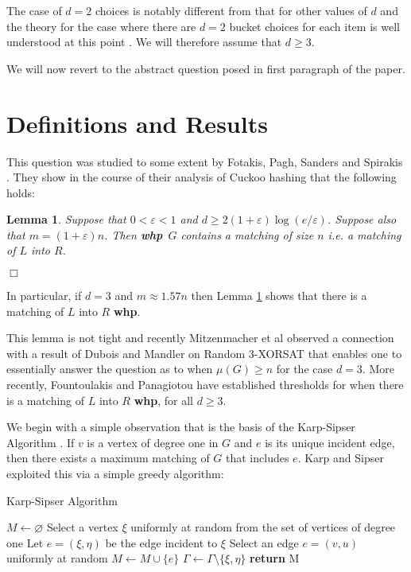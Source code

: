 \documentclass[11pt]{article}
\def\e{\varepsilon}
\def\G{\Gamma}
\def\m{\mu}
\def\whp{{\bf whp}}
\newcommand{\proofend}{\hspace*{\fill}\mbox{$\Box$}}
\newtheorem{lemma}[theorem]{Lemma}
\begin{document}
The case of $d=2$ choices is notably different from that for other values
of $d$ and the theory for the case where there are $d = 2$ 
bucket choices for each item is well understood at this point
\cite{DM,kutz,cuckoo}. We will therefore assume that $d\geq 3$.

We will now revert to the abstract question posed in first paragraph of the paper.
\section{Definitions and Results}
This question was studied to some extent by Fotakis, Pagh, Sanders and Spirakis \cite{fotakis}.
They show in the course of their analysis of Cuckoo hashing that the following holds:
\begin{lemma}\label{fot}
Suppose that $0<\e<1$ and $d\geq 2(1+\e)\log(e/\e)$. Suppose also that $m=(1+\e)n$. Then
\whp\ $G$ contains a matching of size $n$ i.e. a matching of $L$ into $R$.
\end{lemma}
\proofend

In particular, if $d=3$ and $m\approx 1.57n$ then Lemma \ref{fot} shows that there is a matching of $L$ into $R$ \whp.

This lemma is not tight and recently  Mitzenmacher et al \cite{DMP} observed a connection with a result of
Dubois and Mandler on Random 3-XORSAT \cite{DuMa} that enables one to essentially answer the question as to when
$\m(G)\geq n$ for the case $d=3$. More recently, Fountoulakis and Panagiotou \cite{FP} have established 
thresholds for when there is a matching of $L$ into $R$ \whp, for all $d\geq 3$.

We begin with a simple observation that is the basis of the Karp-Sipser Algorithm
\cite{KS,AFP}. If $v$ is a vertex of degree one in $G$ and $e$ is its unique incident edge,
then there exists a maximum matching of $G$ that includes $e$. Karp and Sipser exploited this via a simple 
greedy algorithm:
 \begin{algorithm}
\caption{Karp-Sipser Algorithm}\label{KS}
\begin{algorithmic}[1]
\State $M \gets \varnothing $
\While{$\G \neq \varnothing $}
  \If {$\G$ has vertices of degree one}
    \State Select a vertex $\xi$ uniformly at random from the set of vertices of degree one
    \State Let $e=(\xi,\eta)$ be the edge incident to $\xi$
  \Else
    \State Select an edge $e=(v,u)$ uniformly at random\label{phase2}
  \EndIf
  \State $M\gets M \cup \{e\}$
  \State $\G\gets \G\setminus\{\xi,\eta\}$ 
\EndWhile
\State \textbf{return} M
\EndProcedure
\end{algorithmic}
\end{algorithm}
\end{document}
